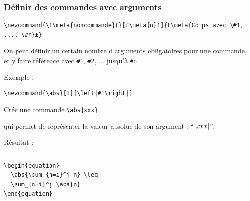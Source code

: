 \documentclass{beamer}
\newcommand{\abs}[1]{\ensuremath\left|#1\right|}
\begin{document}
\begin{frame}[fragile]
  \frametitle{Définir des commandes avec arguments}

\begin{lstlisting}
\newcommand{\£\meta{nomcommande}£}[£\meta{n}£]{£\meta{Corps avec \#1, ..., \#n}£}
\end{lstlisting}
On peut définir un certain nombre d'arguments obligatoires pour une commande, et y faire référence avec \lstinline?#1?, \lstinline?#2?, ... jusqu'à \lstinline?#n?.

\bigskip
Exemple :
\begin{lstlisting}
\newcommand{\abs}[1]{\left|#1\right|}
\end{lstlisting}
Crée une commande \lstinline?\abs{xxx}?

qui permet de représenter la valeur absolue de son argument : “$\abs{xxx}$”.

\bigskip
Résultat :
\begin{columns}
\begin{column}{.45\textwidth}
\begin{lstlisting}
\begin{equation}
  \abs{\sum_{n=i}^j n} \leq
  \sum_{n=i}^j \abs{n}
\end{equation}
\end{lstlisting}
\end{column}

\begin{column}{.45\textwidth}
\myex{%
\begin{equation}
  \abs{\sum_{n=i}^j n} \leq
  \sum_{n=i}^j \abs{n}
\end{equation}
}
\end{column}
\end{columns}

\end{frame}
\end{document}
